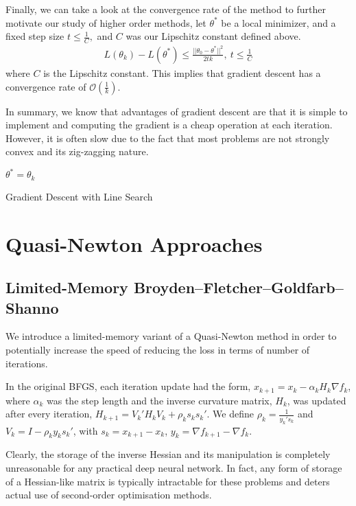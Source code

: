 \documentclass{article}
\begin{document}
Finally, we can take a look at the convergence rate of the method to further motivate our study of higher order methods, let $\theta^*$ be a local minimizer, and a fixed step size $t \leq \frac{1}{C},$ and $C$ was our Lipschitz constant defined above.
\begin{gather*}
L(\theta_k) - L(\theta^*) \leq \frac{||\theta_0 - \theta^*||^2}{2tk},\ t \leq \frac{1}{C}
\end{gather*}
where $C$ is the Lipschitz constant. This implies that gradient descent has a convergence rate of $\mathcal{O}(\frac{1}{k})$.

In summary, we know that advantages of gradient descent are that it is simple to implement and computing the gradient is a cheap operation at each iteration. However, it is often slow due to the fact that most problems are not strongly convex and its zig-zagging nature.


\begin{algorithm}[H]
\SetAlgoLined
\KwResult{$\theta^{*}$ } 
 $\theta^* = \theta_k$\;
 \caption{Gradient Descent with Line Search}
 \end{algorithm}
 
 \section{Quasi-Newton Approaches}
\subsection{Limited-Memory Broyden–Fletcher–Goldfarb–Shanno}

We introduce a limited-memory variant of a Quasi-Newton method in order to potentially increase the speed of reducing the loss in terms of number of iterations. 

In the original BFGS, each iteration update had the form, $x_{k+1} = x_{k} - \alpha_k H_k \nabla f_k$, where $\alpha_k$ was the step length and the inverse curvature matrix, $H_k$, was updated after every iteration, $H_{k+1} = V_k'H_kV_k + \rho_ks_ks_k'$. We define $\rho_k = \frac{1}{y_k's_k}$ and $V_k = I - \rho_ky_ks_k'$, with $s_k = x_{k+1} - x_k$, $y_k = \nabla f_{k+1} - \nabla f_k$.

Clearly, the storage of the inverse Hessian and its manipulation is completely unreasonable for any practical deep neural network. In fact, any form of storage of a Hessian-like matrix is typically intractable for these problems and deters actual use of second-order optimisation methods.
\end{document}
